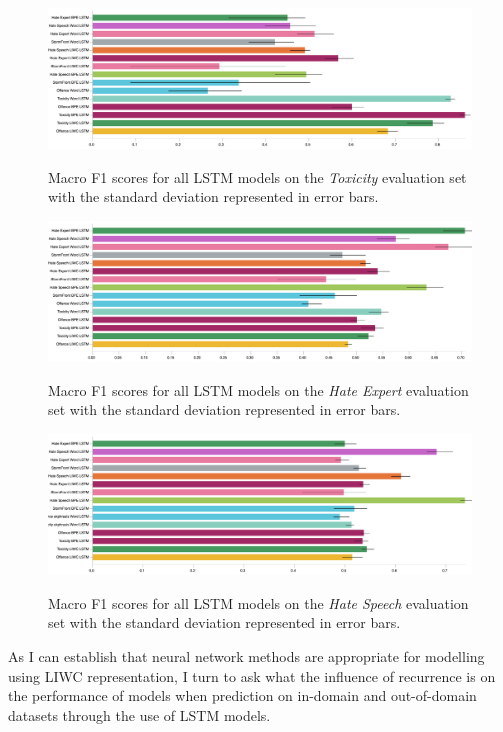\begin{figure}
\begin{minipage}{\textwidth}
    \centering
    \includegraphics[width=\textwidth]{all_lstm_wulczyn_test.pdf}
    \caption{Macro F1 scores for all LSTM models on the \textit{Toxicity} evaluation set with the standard deviation represented in error bars.}
    \label{fig:wulczyn_lstm_test}
  \vfill
    \includegraphics[width=\textwidth]{all_lstm_waseem_test.pdf}
    \caption{Macro F1 scores for all LSTM models on the \textit{Hate Expert} evaluation set with the standard deviation represented in error bars.}
    \label{fig:waseem_lstm_test}
    \vfill
    \includegraphics[width=\textwidth]{all_lstm_waseem_hovy_test.pdf}
    \caption{Macro F1 scores for all LSTM models on the \textit{Hate Speech} evaluation set with the standard deviation represented in error bars.}
  \label{fig:waseem_hovy_lstm_test}  
\end{minipage}
\end{figure}

As I can establish that neural network methods are appropriate for modelling using LIWC representation, I turn to ask what the influence of recurrence is on the performance of models when prediction on in-domain and out-of-domain datasets through the use of LSTM models.

